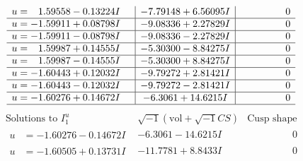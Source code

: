 \documentclass[1p]{elsarticle_modified}
\theoremstyle{definition}
\newcommand{\I}{\sqrt{-1}}
\begin{document}
$$\begin{array}{c|c|c}
\begin{aligned}
u &= \phantom{-}1.59558 - 0.13224 I\end{aligned}
 & -7.79148 + 6.56095 I & \phantom{-0.000000 } 0 \\ \hline\begin{aligned}
u &= -1.59911 + 0.08798 I\end{aligned}
 & -9.08336 + 2.27829 I & \phantom{-0.000000 } 0 \\ \hline\begin{aligned}
u &= -1.59911 - 0.08798 I\end{aligned}
 & -9.08336 - 2.27829 I & \phantom{-0.000000 } 0 \\ \hline\begin{aligned}
u &= \phantom{-}1.59987 + 0.14555 I\end{aligned}
 & -5.30300 - 8.84275 I & \phantom{-0.000000 } 0 \\ \hline\begin{aligned}
u &= \phantom{-}1.59987 - 0.14555 I\end{aligned}
 & -5.30300 + 8.84275 I & \phantom{-0.000000 } 0 \\ \hline\begin{aligned}
u &= -1.60443 + 0.12032 I\end{aligned}
 & -9.79272 + 2.81421 I & \phantom{-0.000000 } 0 \\ \hline\begin{aligned}
u &= -1.60443 - 0.12032 I\end{aligned}
 & -9.79272 - 2.81421 I & \phantom{-0.000000 } 0 \\ \hline\begin{aligned}
u &= -1.60276 + 0.14672 I\end{aligned}
 & -6.3061 + 14.6215 I & \phantom{-0.000000 } 0\\
 \hline 
 \end{array}$$\newpage$$\begin{array}{c|c|c}  
\text{Solutions to }I^u_{1}& \I (\text{vol} + \sqrt{-1}CS) & \text{Cusp shape}\\
 \hline 
\begin{aligned}
u &= -1.60276 - 0.14672 I\end{aligned}
 & -6.3061 - 14.6215 I & \phantom{-0.000000 } 0 \\ \hline\begin{aligned}
u &= -1.60505 + 0.13731 I\end{aligned}
 & -11.7781 + 8.8433 I & \phantom{-0.000000 } 0 \\ \hline\begin{aligned}

\end{aligned}
\end{array}$$
\end{document}
